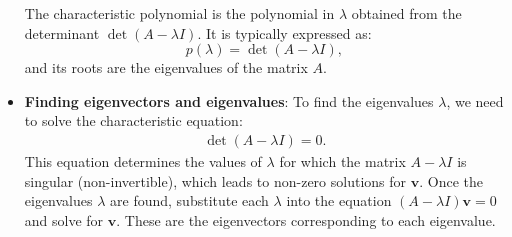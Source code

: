 \documentclass{report}
\begin{document}
\begin{itemize}
             The characteristic polynomial is the polynomial in \( \lambda \) obtained from the determinant \( \det(A - \lambda I) \). It is typically expressed as:
            \[
                p(\lambda) = \det(A - \lambda I),
            \]
            and its roots are the eigenvalues of the matrix \( A \).
        \item \textbf{Finding eigenvectors and eigenvalues}: To find the eigenvalues $\lambda$, we need to solve the characteristic equation:
            \begin{align*}
                \det(A - \lambda I) =0
            .\end{align*}
            \bigbreak \noindent 
            This equation determines the values of $\lambda$ for which the matrix $A-\lambda I$ is singular (non-invertible), which leads to non-zero solutions for $\mathbf{v}$.
            \bigbreak \noindent 
            Once the eigenvalues $\lambda$ are found, substitute each $\lambda$ into the equation $(A-\lambda I)\mathbf{v}=0$ and solve for $\mathbf{v}$. These are the eigenvectors corresponding to each eigenvalue.

    \end{itemize}
\end{document}
